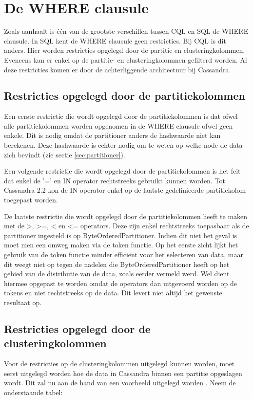 \section{De WHERE clausule}
Zoals \cite{Lerer2015Where} aanhaalt is één van de grootste verschillen tussen CQL en SQL de WHERE clausule.
In SQL kent de WHERE clausule geen restricties.
Bij CQL is dit anders.
Hier worden restricties opgelegd door de partitie en clusteringkolommen.
Eveneens kan er enkel op de partitie- en clusteringkolommen gefilterd worden.
Al deze restricties komen er door de achterliggende architectuur bij Cassandra.

\subsection{Restricties opgelegd door de partitiekolommen}
Een eerste restrictie die wordt opgelegd door de partitiekolommen is dat ofwel alle partitiekolommen worden opgenomen in de WHERE clausule ofwel geen enkele.
Dit is nodig omdat de partitioner anders de hashwaarde niet kan berekenen.
Deze hashwaarde is echter nodig om te weten op welke node de data zich bevindt (zie sectie \ref{sec:partitioner}).

Een volgende restrictie die wordt opgelegd door de partitiekolommen is het feit dat enkel de '=' en IN operator rechtstreeks gebruikt kunnen worden.
Tot Cassandra 2.2 kon de IN operator enkel op de laatste gedefinieerde partitiekolom toegepast worden.

De laatste restrictie die wordt opgelegd door de partitiekolommen heeft te maken met de >, >=, < en <= operators.
Deze zijn enkel rechtstreeks toepasbaar als de partitioner ingesteld is op ByteOrderedPartitioner.
Indien dit niet het geval is moet men een omweg maken via de token functie.
Op het eerste zicht lijkt het gebruik van de token functie minder efficiënt voor het selecteren van data, maar dit weegt niet op tegen de nadelen die ByteOrderedPartitioner heeft op het gebied van de distributie van de data, zoals eerder vermeld werd.
Wel dient hiermee opgepast te worden omdat de operators dan uitgevoerd worden op de tokens en niet rechtstreeks op de data.
Dit levert niet altijd het gewenste resultaat op.

\subsection{Restricties opgelegd door de clusteringkolommen}
Voor de restricties op de clusteringkolommen uitgelegd kunnen worden, moet eerst uitgelegd worden hoe de data in Cassandra binnen een partitie opgeslagen wordt.
Dit zal nu aan de hand van een voorbeeld uitgelegd worden \citep{Lerer2015Where}.
Neem de onderstaande tabel:

